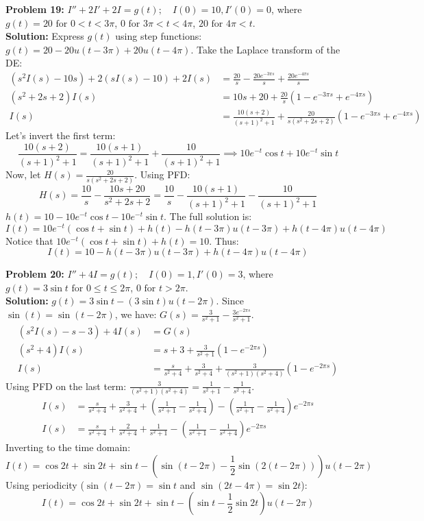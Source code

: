 \documentclass[11pt, letterpaper]{article}
\theoremstyle{definition}
\theoremstyle{remark}
\begin{document}
\textbf{Problem 19:} $I'' + 2I' + 2I = g(t); \quad I(0)=10, I'(0)=0$, where $g(t) = 20 \text{ for } 0<t<3\pi$, $0 \text{ for } 3\pi<t<4\pi$, $20 \text{ for } 4\pi<t$.
\\[4pt]
\textbf{Solution:}
Express $g(t)$ using step functions:
$g(t) = 20 - 20u(t-3\pi) + 20u(t-4\pi)$.
Take the Laplace transform of the DE:
\begin{align*}
(s^2 I(s) - 10s) + 2(s I(s) - 10) + 2I(s) &= \frac{20}{s} - \frac{20e^{-3\pi s}}{s} + \frac{20e^{-4\pi s}}{s} \\
(s^2+2s+2)I(s) &= 10s + 20 + \frac{20}{s}(1 - e^{-3\pi s} + e^{-4\pi s}) \\
I(s) &= \frac{10(s+2)}{(s+1)^2+1} + \frac{20}{s(s^2+2s+2)}(1 - e^{-3\pi s} + e^{-4\pi s})
\end{align*}
Let's invert the first term:
\[
\frac{10(s+2)}{(s+1)^2+1} = \frac{10(s+1)}{(s+1)^2+1} + \frac{10}{(s+1)^2+1} \implies 10e^{-t}\cos t + 10e^{-t}\sin t
\]
Now, let $H(s) = \frac{20}{s(s^2+2s+2)}$. Using PFD:
\[
H(s) = \frac{10}{s} - \frac{10s+20}{s^2+2s+2} = \frac{10}{s} - \frac{10(s+1)}{(s+1)^2+1} - \frac{10}{(s+1)^2+1}
\]
$h(t) = 10 - 10e^{-t}\cos t - 10e^{-t}\sin t$.
The full solution is:
\[
I(t) = 10e^{-t}(\cos t + \sin t) + h(t) - h(t-3\pi)u(t-3\pi) + h(t-4\pi)u(t-4\pi)
\]
Notice that $10e^{-t}(\cos t + \sin t) + h(t) = 10$. Thus:
\[
I(t) = 10 - h(t-3\pi)u(t-3\pi) + h(t-4\pi)u(t-4\pi)
\]

\textbf{Problem 20:} $I'' + 4I = g(t); \quad I(0)=1, I'(0)=3$, where $g(t) = 3\sin t \text{ for } 0 \le t \le 2\pi$, $0 \text{ for } t > 2\pi$.
\\[4pt]
\textbf{Solution:}
$g(t) = 3\sin t - (3\sin t)u(t-2\pi)$. Since $\sin(t) = \sin(t-2\pi)$, we have:
$G(s) = \frac{3}{s^2+1} - \frac{3e^{-2\pi s}}{s^2+1}$.
\begin{align*}
(s^2 I(s) - s - 3) + 4I(s) &= G(s) \\
(s^2+4)I(s) &= s + 3 + \frac{3}{s^2+1}(1 - e^{-2\pi s}) \\
I(s) &= \frac{s}{s^2+4} + \frac{3}{s^2+4} + \frac{3}{(s^2+1)(s^2+4)}(1 - e^{-2\pi s})
\end{align*}
Using PFD on the last term: $\frac{3}{(s^2+1)(s^2+4)} = \frac{1}{s^2+1} - \frac{1}{s^2+4}$.
\begin{align*}
I(s) &= \frac{s}{s^2+4} + \frac{3}{s^2+4} + \left( \frac{1}{s^2+1} - \frac{1}{s^2+4} \right) - \left( \frac{1}{s^2+1} - \frac{1}{s^2+4} \right)e^{-2\pi s} \\
I(s) &= \frac{s}{s^2+4} + \frac{2}{s^2+4} + \frac{1}{s^2+1} - \left( \frac{1}{s^2+1} - \frac{1}{s^2+4} \right)e^{-2\pi s}
\end{align*}
Inverting to the time domain:
\[
I(t) = \cos 2t + \sin 2t + \sin t - \left( \sin(t-2\pi) - \frac{1}{2}\sin(2(t-2\pi)) \right)u(t-2\pi)
\]
Using periodicity ($\sin(t-2\pi) = \sin t$ and $\sin(2t-4\pi) = \sin 2t$):
\[
I(t) = \cos 2t + \sin 2t + \sin t - \left( \sin t - \frac{1}{2}\sin 2t \right)u(t-2\pi)
\]
\end{document}
